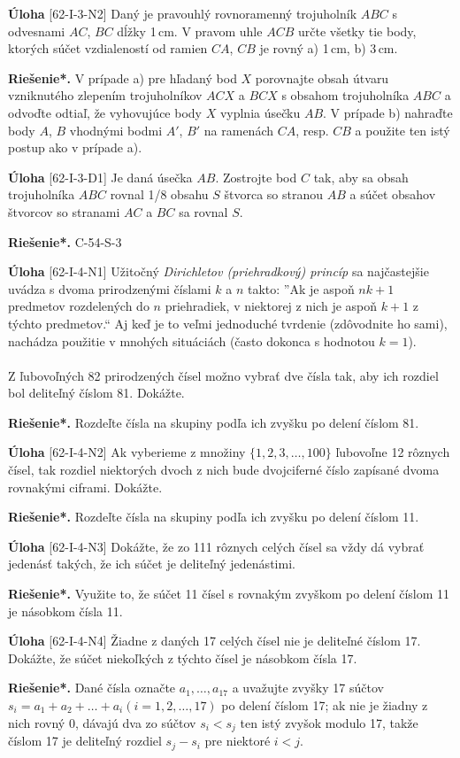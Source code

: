 \documentclass{article}
\newcommand{\rieh}{\textbf{Riešenie*.} }
\newcommand{\problem}[3]{
  \begin{tcolorbox}[breakable,notitle,boxrule=0pt,colback=light-gray,colframe=light-gray]
    \textbf{Úloha}
    [#1] #2
  \end{tcolorbox}
  \noindent#3
}
\begin{document}
\problem{62-I-3-N2}{
Daný je pravouhlý rovnoramenný trojuholník $ABC$ s odvesnami $AC$, $BC$ dĺžky 1\,cm. V pravom uhle $ACB$ určte všetky tie body, ktorých súčet vzdialeností od ramien $CA$, $CB$ je rovný a) 1\,cm, b) 3\,cm.
}{
\rieh V prípade a) pre hľadaný bod $X$ porovnajte obsah útvaru vzniknutého zlepením trojuholníkov $ACX$ a $BCX$ s obsahom trojuholníka $ABC$ a odvoďte odtiaľ, že vyhovujúce body $X$ vyplnia úsečku $AB$. V prípade b) nahraďte body $A$, $B$ vhodnými bodmi $A'$, $B'$ na ramenách $CA$, resp. $CB$ a použite ten istý postup ako v prípade a).
}

\problem{62-I-3-D1}{
Je daná úsečka $AB$. Zostrojte bod $C$ tak, aby sa obsah trojuholníka $ABC$ rovnal 1/8 obsahu $S$ štvorca so stranou $AB$ a súčet obsahov štvorcov so stranami $AC$ a $BC$ sa rovnal $S$.
}{
\rieh C-54-S-3
}

\problem{62-I-4-N1}{
Užitočný \textit{Dirichletov (priehradkový) princíp} sa najčastejšie uvádza s dvoma prirodzenými číslami $k$ a $n$ takto: ”Ak je aspoň $nk+1$ predmetov rozdelených do $n$ priehradiek, v niektorej z nich je aspoň $k + 1$ z týchto predmetov.“ Aj keď je to veľmi jednoduché tvrdenie (zdôvodnite ho sami), nachádza použitie v mnohých situáciách (často dokonca s hodnotou $k = 1$).\\
\\
Z ľubovoľných 82 prirodzených čísel možno vybrať dve čísla tak, aby ich rozdiel bol deliteľný číslom 81. Dokážte.
}{
\rieh Rozdeľte čísla na skupiny podľa ich zvyšku po delení číslom 81.
}


\problem{62-I-4-N2}{
Ak vyberieme z množiny $\{1, 2, 3, \ldots , 100\}$ ľubovoľne 12 rôznych čísel, tak rozdiel niektorých dvoch z nich bude dvojciferné číslo zapísané dvoma rovnakými ciframi. Dokážte.
}{
\rieh Rozdeľte čísla na skupiny podľa ich zvyšku po delení číslom 11.
}


\problem{62-I-4-N3}{
Dokážte, že zo 111 rôznych celých čísel sa vždy dá vybrať jedenásť takých, že ich súčet je deliteľný jedenástimi.
}{
\rieh Využite to, že súčet 11 čísel s rovnakým zvyškom po delení číslom 11 je násobkom čísla 11.
}


\problem{62-I-4-N4}{
Žiadne z daných 17 celých čísel nie je deliteľné číslom 17. Dokážte, že súčet niekoľkých z týchto čísel je násobkom čísla 17.
}{
\rieh Dané čísla označte $a_1, \ldots, a_{17}$ a uvažujte zvyšky 17 súčtov $s_i = a_1 + a_2 + \ldots + a_i (i = 1, 2, \ldots, 17)$ po delení číslom 17; ak nie je žiadny z nich rovný 0, dávajú dva zo súčtov $s_i < s_j$ ten istý zvyšok modulo 17, takže číslom 17 je deliteľný rozdiel $s_j - s_i$ pre niektoré $i < j$.
}
\end{document}
